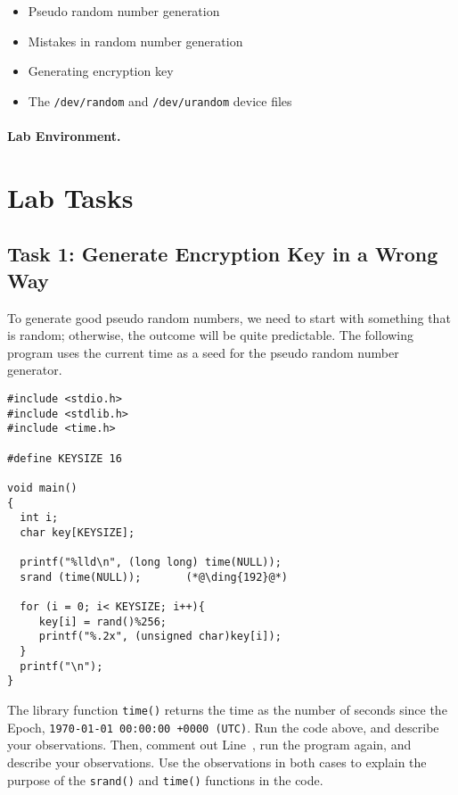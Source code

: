 \begin{itemize}[noitemsep]
\item Pseudo random number generation
\item Mistakes in random number generation
\item Generating encryption key
\item The \texttt{/dev/random} and \texttt{/dev/urandom} device files  
\end{itemize}


\paragraph{Lab Environment.} \seedenvironmentB


\section{Lab Tasks}



\subsection{Task 1: Generate Encryption Key in a Wrong Way}

To generate good pseudo random numbers, we need to start with something
that is random; otherwise, the outcome will be quite predictable. 
The following program uses the current time as a seed for the 
pseudo random number generator.


\begin{lstlisting}[caption="Generating a 128-bit encryption key", label=enc:code:key_gen]
#include <stdio.h>
#include <stdlib.h>
#include <time.h>

#define KEYSIZE 16

void main()
{
  int i;
  char key[KEYSIZE];

  printf("%lld\n", (long long) time(NULL));
  srand (time(NULL));       (*@\ding{192}@*)

  for (i = 0; i< KEYSIZE; i++){
     key[i] = rand()%256;
     printf("%.2x", (unsigned char)key[i]);
  }
  printf("\n");
}
\end{lstlisting}
 

The library function \texttt{time()} returns the time as the number of seconds since the Epoch,
\texttt{1970-01-01 00:00:00 +0000 (UTC)}. Run the code above, and describe your
observations. Then, comment out Line~, run the program again, and describe your
observations. Use the observations in both cases to explain the purpose of 
the \texttt{srand()} and \texttt{time()} functions in the code. 




